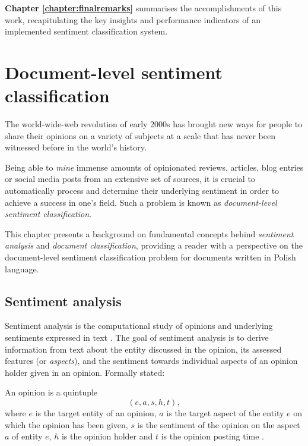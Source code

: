 \textbf{Chapter \ref{chapter:finalremarks}} summarises the accomplishments of this work, recapitulating the key insights and performance indicators of an implemented sentiment classification system.

\cleardoublepage

\chapter{Document-level sentiment classification}
\label{chapter:sentiment}

The world-wide-web revolution of early 2000s has brought new ways for people to share their opinions on a variety of subjects at a scale that has never been witnessed before in the world's history. 

Being able to \emph{mine} immense amounts of opinionated reviews, articles, blog entries or social media posts from an extensive set of sources, it is crucial to automatically process and determine their underlying sentiment in order to achieve a success in one's field. Such a problem is known as \emph{document-level sentiment classification}.

This chapter presents a background on fundamental concepts behind \emph{sentiment analysis} and \emph{document classification}, providing a reader with a perspective on the document-level sentiment classification problem for documents written in Polish language. 


\section{Sentiment analysis}

Sentiment analysis is the computational study of opinions and underlying sentiments expressed in text \cite{handbook_nlp}. The goal of sentiment analysis is to derive information from text about the entity discussed in the opinion, its assessed features (or \emph{aspects}), and the sentiment towards individual aspects of an opinion holder given in an opinion. Formally stated:

\begin{definition}
\label{def:opinion}
An opinion is a quintuple
\begin{equation}
(e, a, s, h, t),
\end{equation}
where $e$ is the target entity of an opinion, $a$ is the target aspect of the entity $e$ on which the opinion has been given, $s$ is the sentiment of the opinion on the aspect $a$ of entity $e$, $h$ is the opinion holder and $t$ is the opinion posting time \cite{liu}.
\end{definition}

